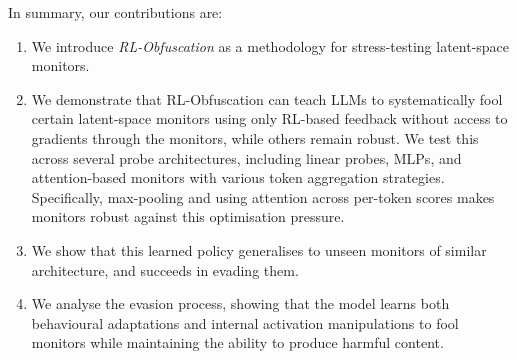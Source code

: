 In summary, our contributions are: \vspace{-4pt}
\begin{enumerate}
    \item We introduce \emph{RL-Obfuscation} as a methodology for stress-testing latent-space monitors.
    \vspace{-3pt}
    \item We demonstrate that RL-Obfuscation can teach LLMs to systematically fool certain latent-space monitors using only RL-based feedback without access to gradients through the monitors, while others remain robust. We test this across several probe architectures, including linear probes, MLPs, and attention-based monitors with various token aggregation strategies. Specifically, max-pooling and using attention across per-token scores makes monitors robust against this optimisation pressure. 
    \item We show that this learned policy generalises to unseen monitors of similar architecture, and succeeds in evading them. 
    \item We analyse the evasion process, showing that the model learns both behavioural adaptations and internal activation manipulations to fool monitors while maintaining the ability to produce harmful content.
\end{enumerate}





